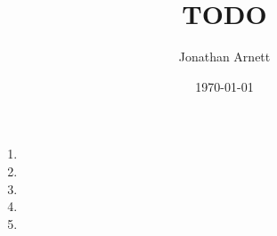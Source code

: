 \documentclass[]{article}
\begin{document}
\title{TODO}
\author{Jonathan Arnett}
\date{\today}
\maketitle

\begin{enumerate}
  \item
  \item
  \item
  \item
  \item
\end{enumerate}
\end{document}
